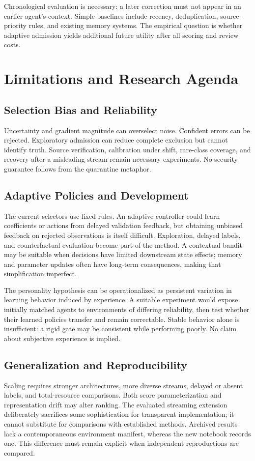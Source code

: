 \documentclass[conference]{IEEEtran}
\begin{document}
Chronological evaluation is necessary: a later correction must not appear in an earlier agent's context. Simple baselines include recency, deduplication, source-priority rules, and existing memory systems. The empirical question is whether adaptive admission yields additional future utility after all scoring and review costs.

\section{Limitations and Research Agenda}
\subsection{Selection Bias and Reliability}
Uncertainty and gradient magnitude can overselect noise. Confident errors can be rejected. Exploratory admission can reduce complete exclusion but cannot identify truth. Source verification, calibration under shift, rare-class coverage, and recovery after a misleading stream remain necessary experiments. No security guarantee follows from the quarantine metaphor.

\subsection{Adaptive Policies and Development}
The current selectors use fixed rules. An adaptive controller could learn coefficients or actions from delayed validation feedback, but obtaining unbiased feedback on rejected observations is itself difficult. Exploration, delayed labels, and counterfactual evaluation become part of the method. A contextual bandit may be suitable when decisions have limited downstream state effects; memory and parameter updates often have long-term consequences, making that simplification imperfect.

The personality hypothesis can be operationalized as persistent variation in learning behavior induced by experience. A suitable experiment would expose initially matched agents to environments of differing reliability, then test whether their learned policies transfer and remain correctable. Stable behavior alone is insufficient: a rigid gate may be consistent while performing poorly. No claim about subjective experience is implied.

\subsection{Generalization and Reproducibility}
Scaling requires stronger architectures, more diverse streams, delayed or absent labels, and total-resource comparisons. Both score parameterization and representation drift may alter ranking. The evaluated streaming extension deliberately sacrifices some sophistication for transparent implementation; it cannot substitute for comparisons with established methods. Archived results lack a contemporaneous environment manifest, whereas the new notebook records one. This difference must remain explicit when independent reproductions are compared.
\end{document}
